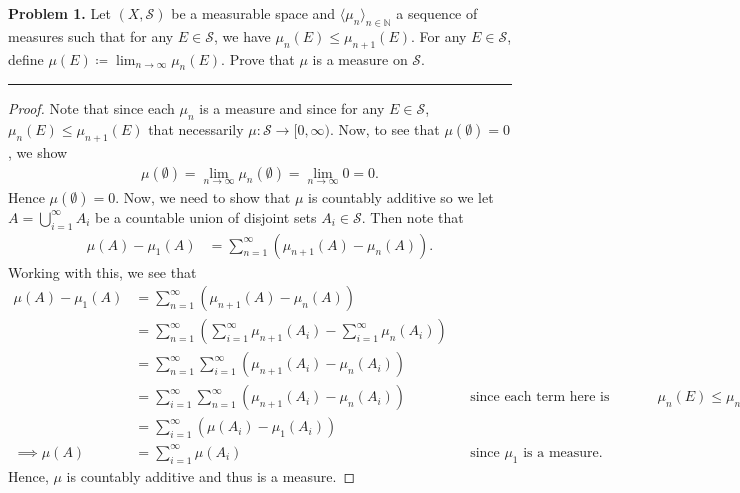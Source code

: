 \documentclass[leqno]{article}
\theoremstyle{nonumberplain}
\newtheorem{proof}{Proof}
\newcommand{\N}{\mathbb{N}}
\newcommand{\Sets}{\mathcal{S}}
\begin{document}
\pagebreak


\noindent\textbf{Problem 1.} \quad
Let $(X,\mathcal{S})$ be a measurable space and $\langle \mu_n \rangle_{n\in \N}$ a sequence of measures such that for any $E\in \mathcal{S}$, we have $\mu_n(E)\leq \mu_{n+1} (E)$. For any $E\in \mathcal{S}$, define $\mu(E)\coloneqq \lim_{n\to \infty} \mu_n(E)$. Prove that $\mu$ is a measure on $\Sets$.

\noindent\rule[0.5ex]{\linewidth}{1pt}

\begin{proof}
Note that since each $\mu_n$ is a measure and since for any $E\in \Sets$, $\mu_n(E)\leq \mu_{n+1}(E)$ that necessarily $\mu \colon \Sets \to [0,\infty)$.  Now, to see that $\mu(\emptyset)=0$, we show
\begin{align*}
\mu(\emptyset)=\lim_{n\to \infty} \mu_n(\emptyset)=\lim_{n\to \infty} 0 = 0.
\end{align*}
Hence $\mu(\emptyset)=0$.  Now, we need to show that $\mu$ is countably additive so we let $A=\bigcup_{i=1}^\infty A_i$ be a countable union of disjoint sets $A_i\in \Sets$. Then note that
\begin{align*}
\mu(A)-\mu_1(A)&=\sum_{n=1}^\infty (\mu_{n+1}(A)-\mu_n(A)).
\end{align*}
Working with this, we see that
\begin{align*}
\mu(A)-\mu_1(A)&=\sum_{n=1}^\infty (\mu_{n+1}(A)-\mu_n(A))\\
&= \sum_{n=1}^\infty \left( \sum_{i=1}^\infty \mu_{n+1}(A_i) -\sum_{i=1}^\infty \mu_n(A_i)\right)\\
&= \sum_{n=1}^\infty \sum_{i=1}^\infty \left( \mu_{n+1}(A_i)-\mu_{n}(A_i)\right)\\
&= \sum_{i=1}^\infty \sum_{n=1}^\infty \left( \mu_{n+1}(A_i)-\mu_{n}(A_i)\right)&&\textrm{since each term here is positive by $\mu_n(E)\leq \mu_{n+1}(E)$}\\
&=\sum_{i=1}^\infty (\mu(A_i)-\mu_1(A_i))\\
\implies \mu(A)&=\sum_{i=1}^\infty \mu(A_i) &&\textrm{since $\mu_1$ is a measure}.
\end{align*}
Hence, $\mu$ is countably additive and thus is a measure.
\end{proof}
\end{document}

